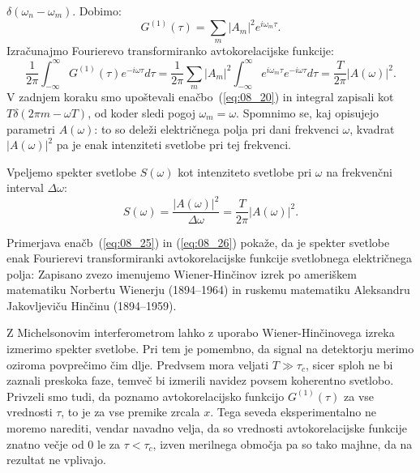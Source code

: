$\delta(\omega_n - \omega_m)$. Dobimo:
\begin{equation}
G^{(1)}(\tau) = \sum_m|A_m|^2e^{i\omega_m\tau}.
\label{eq:08_24}
\end{equation} 
Izračunajmo Fourierevo transformiranko avtokorelacijske funkcije:
\begin{equation}
\frac{1}{2\pi}\int_{-\infty}^{\infty} G^{(1)} (\tau) e^{-i\omega \tau} d\tau = 
\frac{1}{2\pi}\sum_m |A_m|^2 \int_{-\infty}^{\infty} e^{i\omega_m\tau}e^{-i\omega \tau} d\tau = 
\frac{T}{2\pi}|A (\omega)|^2.
\label{eq:08_25}
\end{equation}
V zadnjem koraku smo upoštevali enačbo~(\ref{eq:08_20}) in integral zapisali kot 
$T \delta (2\pi m  - \omega T)$, od koder sledi pogoj $\omega_m = \omega$. 
Spomnimo se, kaj opisujejo parametri $A(\omega)$: to so deleži električnega polja pri 
dani frekvenci $\omega$, kvadrat $|A(\omega)|^2$ pa je enak intenziteti svetlobe pri tej
frekvenci.

Vpeljemo spekter svetlobe $S(\omega)$ kot intenziteto svetlobe pri $\omega$ na frekvenčni 
interval $\Delta \omega$:
\begin{equation}
S(\omega) = \frac{|A(\omega)|^2}{\Delta \omega} = \frac{T}{2\pi}|A(\omega)|^2.
\label{eq:08_26}
\end{equation}

Primerjava enačb~(\ref{eq:08_25}) in (\ref{eq:08_26}) pokaže, da je spekter svetlobe enak 
Fourierevi transformiranki avtokorelacijske funkcije svetlobnega električnega 
polja:
Zapisano zvezo imenujemo Wiener-Hinčinov izrek po ameriškem matematiku Norbertu
Wienerju (1894--1964) in ruskemu matematiku Aleksandru Jakovljeviču Hinčinu
(1894--1959).

Z Michelsonovim interferometrom lahko z uporabo Wiener-Hinčinovega izreka izmerimo
spekter svetlobe. Pri tem je pomembno, da signal na detektorju merimo oziroma
povprečimo čim dlje. Predvsem mora veljati $T \gg \tau_c$, sicer sploh ne bi zaznali 
preskoka faze, temveč bi izmerili navidez povsem koherentno svetlobo. Privzeli smo tudi,
da poznamo avtokorelacijsko funkcijo $G^{(1)}(\tau)$ 
za vse vrednosti $\tau$, to je za vse premike zrcala $x$. Tega seveda eksperimentalno
ne moremo narediti, vendar navadno velja, da so vrednosti
avtokorelacijske funkcije znatno večje od 0 le za $\tau <\tau_c$, izven merilnega
območja pa so tako majhne, da na rezultat ne vplivajo.

